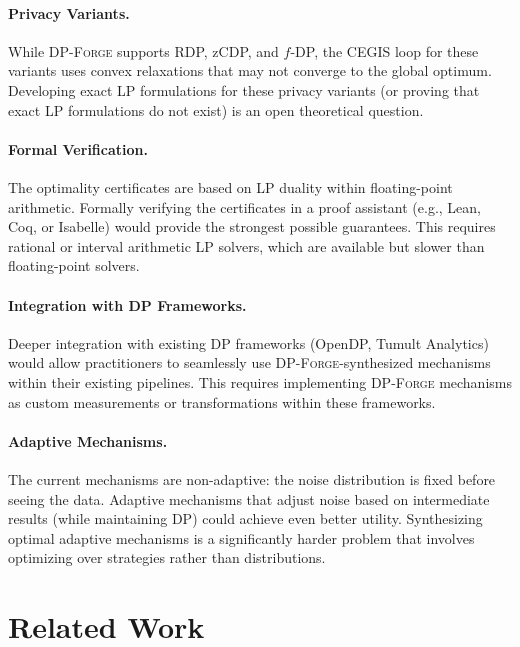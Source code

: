 \documentclass[11pt,a4paper]{article}
\newcommand{\dpforge}{\textsc{DP-Forge}}
\begin{document}
\paragraph{Privacy Variants.}
While \dpforge{} supports RDP, zCDP, and $f$-DP, the CEGIS loop for these
variants uses convex relaxations that may not converge to the global optimum.
Developing exact LP formulations for these privacy variants (or proving that
exact LP formulations do not exist) is an open theoretical question.

\paragraph{Formal Verification.}
The optimality certificates are based on LP duality within floating-point
arithmetic.  Formally verifying the certificates in a proof assistant
(e.g., Lean, Coq, or Isabelle) would provide the strongest possible guarantees.
This requires rational or interval arithmetic LP solvers, which are available
but slower than floating-point solvers.

\paragraph{Integration with DP Frameworks.}
Deeper integration with existing DP frameworks (OpenDP, Tumult Analytics) would
allow practitioners to seamlessly use \dpforge{}-synthesized mechanisms within
their existing pipelines.  This requires implementing \dpforge{} mechanisms as
custom measurements or transformations within these frameworks.

\paragraph{Adaptive Mechanisms.}
The current mechanisms are non-adaptive: the noise distribution is fixed before
seeing the data.  Adaptive mechanisms that adjust noise based on intermediate
results (while maintaining DP) could achieve even better utility.  Synthesizing
optimal adaptive mechanisms is a significantly harder problem that involves
optimizing over strategies rather than distributions.

\section{Related Work}
\label{sec:relatedwork}
\end{document}
